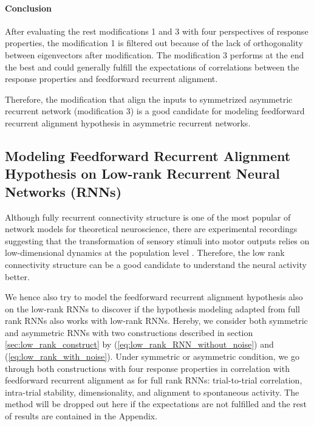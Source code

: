 \documentclass[11pt]{article}
\begin{document}
	\paragraph{Conclusion}
	After evaluating the rest modifications 1 and 3 with four perspectives of response properties, the modification 1 is filtered out because of the lack of orthogonality between eigenvectors after modification. The modification 3 performs at the end the best and could generally fulfill the expectations of correlations between the response properties and feedforward recurrent alignment. 
	
	Therefore, the modification that align the inputs to symmetrized asymmetric recurrent network (modification 3) is a good candidate for modeling feedforward recurrent alignment hypothesis in asymmetric recurrent networks.
	
	\clearpage
	\subsection{Modeling Feedforward Recurrent Alignment Hypothesis on Low-rank Recurrent Neural Networks (RNNs)}
	Although fully recurrent connectivity structure is one of the most popular of network models for theoretical neuroscience, there are experimental recordings suggesting that the transformation of sensory stimuli into motor outputs relies on low-dimensional dynamics at the population level \cite{mastrogiuseppe2018linking}. Therefore, the low rank connectivity structure can be a good candidate to understand the neural activity better. 
	
	We hence also try to model the feedforward recurrent alignment hypothesis also on the low-rank RNNs to discover if the hypothesis modeling adapted from full rank RNNs also works with low-rank RNNs. 
	Hereby, we consider both symmetric and asymmetric RNNs with two constructions described in section \ref{sec:low_rank_construct} by (\ref{eq:low_rank_RNN_without_noise}) and (\ref{eq:low_rank_with_noise}). Under symmetric or asymmetric condition, we go through both constructions with four response properties in correlation with feedforward recurrent alignment as for full rank RNNs: trial-to-trial correlation, intra-trial stability, dimensionality, and alignment to spontaneous activity. The method will be dropped out here if the expectations are not fulfilled and the rest of results are contained in the Appendix. %
	
\end{document}
